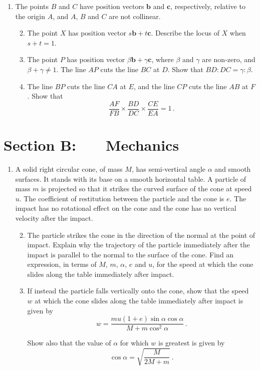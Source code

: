 \documentclass[a4, 11pt]{report}
\newlength{\qspace}
\newcounter{qnumber}
\newenvironment{question}%
 {\vspace{\qspace}
  \begin{enumerate}[\bfseries 1\quad][10]%
    \setcounter{enumi}{\value{qnumber}}%
    \item%
 }
{
  \end{enumerate}
  \filbreak
  \stepcounter{qnumber}
 }
\newenvironment{questionparts}[1][1]%
 {
  \begin{enumerate}[\bfseries (i)]%
    \setcounter{enumii}{#1}
    \addtocounter{enumii}{-1}
    \setlength{\itemsep}{5mm}
    \setlength{\parskip}{8pt}
 }
 {
  \end{enumerate}
 }
\def\bb{\mathbf b}
\def \bc{\mathbf c}
\begin{document}
\begin{question}	
The points $B$ and $C$ have position vectors $\bb$ and $\bc$, 
respectively, relative to the origin $A$, and $A$, $B$ and $C$
are not collinear.

\begin{questionparts}
\item  The point $X$ has position vector 
$s \bb+t\bc$. Describe the locus of $X$ when $s+t=1$.
\item  The point $P$
has position vector $\beta \bb+\gamma\bc$, where $\beta$ and $\gamma$
are 
non-zero, and $\beta+\gamma\ne1$.
The line $AP$ cuts the line $BC$ at $D$. Show that $BD:DC
=\gamma:\beta$.
\item  The line $BP$ cuts the line $CA$ at $E$, and the
  line $CP$ cuts the line $AB$ at $F$. Show that 
\[
\frac{AF}{FB} \times \frac{BD}{DC} \times \frac{CE}{EA}=1\,.
\]

\end{questionparts}
\end{question}	
		

		
	
\newpage
\section*{Section B: \ \ \ Mechanics}


	
\begin{question}
A  solid right circular cone, of mass $M$, has 
semi-vertical angle $\alpha$ and smooth surfaces. 
It stands with its base on
a smooth horizontal table. 
A particle of mass $m$ 
is projected 
 so that it strikes the curved surface of the cone
at speed $u$. 
The  coefficient of restitution
 between the particle  and the cone is $e$.
The impact has no rotational effect on the cone
and the cone has no vertical velocity
after the impact.

\begin{questionparts}
\item The particle strikes the cone in the direction of the normal at
  the point of impact. Explain why the trajectory of the particle
  immediately
after the impact is parallel to the normal to the surface of the cone.
Find an expression, in terms of $M$, $m$,
$\alpha$, $e$ and $u$, for the speed at which the cone slides
along the table immediately after impact.

\item
If instead the particle falls vertically onto the cone, show that the speed $w$
  at which the cone slides
along the table immediately after impact is given by
\[
w= \frac{mu(1+e)\sin\alpha\cos\alpha}{M+m\cos^2\alpha}\,.
\]

Show also that the value of $\alpha$ for which $w$ is greatest is given by
\[
\cos \alpha = \sqrt{ \frac{M}{2M+m}}\ .
\]
\end{questionparts}
	\end{question}
	
\end{document}

